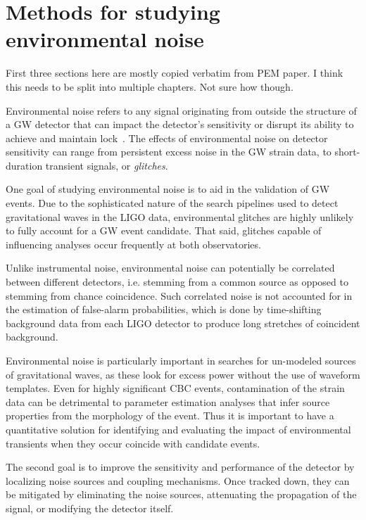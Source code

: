\chapter{Methods for studying environmental noise}

{\color{red}
First three sections here are mostly copied verbatim from PEM paper.
I think this needs to be split into multiple chapters.
Not sure how though.}

Environmental noise refers to any signal originating from outside the structure of a \ac{GW} detector that can impact the detector's sensitivity or disrupt its ability to achieve and maintain lock~\citep{Effler_2015,Nguyen_2021}.
The effects of environmental noise on detector sensitivity can range from persistent excess noise in the \ac{GW} strain data, to short-duration transient signals, or \textit{glitches}.

One goal of studying environmental noise is to aid in the validation of \ac{GW} events.
Due to the sophisticated nature of the search pipelines used to detect gravitational waves in the \ac{LIGO} data, environmental glitches are highly unlikely to fully account for a \ac{GW} event candidate.
That said, glitches capable of influencing analyses occur frequently at both observatories.

Unlike instrumental noise, environmental noise can potentially be correlated between different detectors, i.e. stemming from a common source as opposed to stemming from chance coincidence.
Such correlated noise is not accounted for in the estimation of false-alarm probabilities, which is done by time-shifting background data from each \ac{LIGO} detector to produce long stretches of coincident background.

Environmental noise is particularly important in searches for un-modeled sources of gravitational waves, as these look for excess power without the use of waveform templates.
Even for highly significant \ac{CBC} events, contamination of the strain data can be detrimental to parameter estimation analyses that infer source properties from the morphology of the event.
Thus it is important to have a quantitative solution for identifying and evaluating the impact of environmental transients when they occur coincide with candidate events.

The second goal is to improve the sensitivity and performance of the detector by localizing noise sources and coupling mechanisms. Once tracked down, they can be mitigated by eliminating the noise sources, attenuating the propagation of the signal, or modifying the detector itself.

